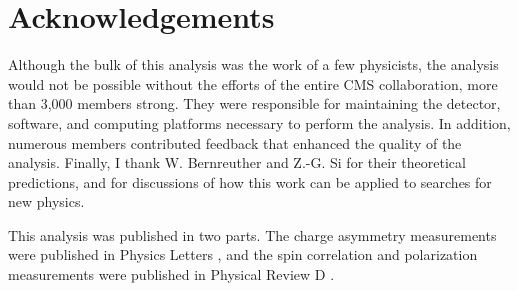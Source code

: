 \section{Acknowledgements}
Although the bulk of this analysis was the work of a few physicists,
the analysis would not be possible without the efforts of the entire
CMS collaboration, more than 3,000 members strong. They were responsible
for maintaining the detector, software, and computing platforms
necessary to perform the analysis. In addition, numerous members
contributed feedback that enhanced the quality of the analysis. Finally, I thank
W. Bernreuther and Z.-G. Si for their theoretical predictions, and for
discussions of how this work can be applied to searches for new physics.

This analysis was published in two parts. The charge asymmetry
measurements were published in Physics Letters \cite{chargeasym}, and the
spin correlation and polarization measurements were published in
Physical Review D \cite{spincorrpol}.
